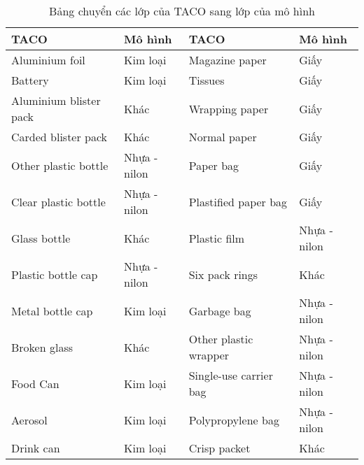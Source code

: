 \documentclass[../the.tex]{subfiles}
\begin{document}
\begin{table}[!h]
	\centering
	\begin{threeparttable}
		\caption{Bảng chuyển các lớp của TACO sang lớp của mô hình}
		\begin{tabular}{ll|ll}
			\hline
			\multicolumn{1}{l}{\textbf{TACO}}
			                       & \multicolumn{1}{l}{\textbf{Mô hình}}
			                       & \multicolumn{1}{l}{\textbf{TACO}}
			                       & \multicolumn{1}{l}{\textbf{Mô hình}}                                            \\
			\hline
			Aluminium foil         & Kim loại                             & Magazine paper            & Giấy         \\ \hline
			Battery                & Kim loại                             & Tissues                   & Giấy         \\ \hline
			Aluminium blister pack & Khác                                 & Wrapping paper            & Giấy         \\ \hline
			Carded blister pack    & Khác                                 & Normal paper              & Giấy         \\ \hline
			Other plastic bottle   & Nhựa - nilon                         & Paper bag                 & Giấy         \\ \hline
			Clear plastic bottle   & Nhựa - nilon                         & Plastified paper bag      & Giấy         \\ \hline
			Glass bottle           & Khác                                 & Plastic film              & Nhựa - nilon \\ \hline
			Plastic bottle cap     & Nhựa - nilon                         & Six pack rings            & Khác         \\ \hline
			Metal bottle cap       & Kim loại                             & Garbage bag               & Nhựa - nilon \\ \hline
			Broken glass           & Khác                                 & Other plastic wrapper     & Nhựa - nilon \\ \hline
			Food Can               & Kim loại                             & Single-use carrier bag    & Nhựa - nilon \\ \hline
			Aerosol                & Kim loại                             & Polypropylene bag         & Nhựa - nilon \\ \hline
			Drink can              & Kim loại                             & Crisp packet              & Khác         \\ \hline

\end{tabular}
\end{threeparttable}
\end{table}
\end{document}
